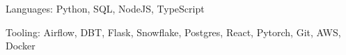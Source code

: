 


\begin{cvskills}


\cvskill
{Languages:} %
{Python, SQL, NodeJS, TypeScript} %


\cvskill
{Tooling:} %
{Airflow, DBT, Flask, Snowflake, Postgres, React, Pytorch, Git, AWS, Docker}


\end{cvskills}